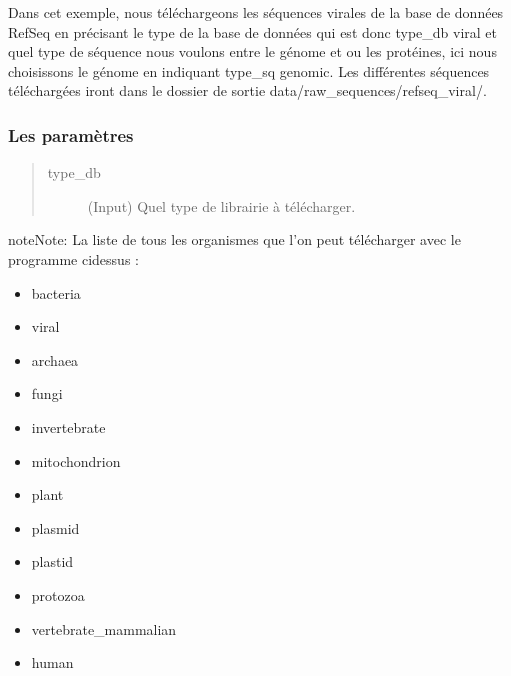 \documentclass[letterpaper,10pt,french]{sphinxmanual}
\begin{document}
Dans cet exemple, nous téléchargeons les séquences virales de la base de données RefSeq en précisant le type de la base de données qui est donc \sphinxhyphen{}type\_db viral et quel type de séquence nous voulons entre le génome et ou les protéines, ici nous choisissons le génome en indiquant \sphinxhyphen{}type\_sq genomic. Les différentes séquences téléchargées iront dans le dossier de sortie data/raw\_sequences/refseq\_viral/.


\subsubsection{Les paramètres}
\label{\detokenize{tutorial:id17}}\begin{quote}\begin{description}
\item[{\sphinxhyphen{}type\_db}] \leavevmode
(Input) Quel type de librairie à télécharger.

\end{description}\end{quote}

\begin{sphinxadmonition}{note}{Note:}
La liste de tous les organismes que l’on peut télécharger avec le programme ci\sphinxhyphen{}dessus :
\begin{itemize}
\item {} 
bacteria

\item {} 
viral

\item {} 
archaea

\item {} 
fungi

\item {} 
invertebrate

\item {} 
mitochondrion

\item {} 
plant

\item {} 
plasmid

\item {} 
plastid

\item {} 
protozoa

\item {} 
vertebrate\_mammalian

\item {} 
human

\end{itemize}
\end{sphinxadmonition}
\end{document}
